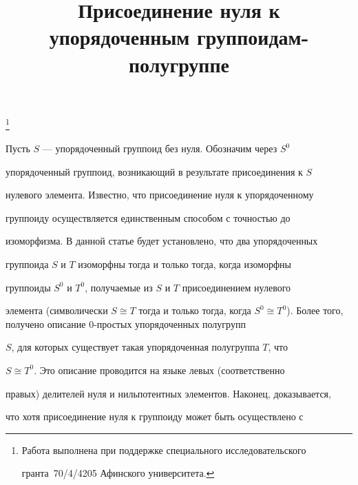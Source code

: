 \title{Присоединение нуля к упорядоченным группоидам-полугруппе} 


\thanks{Работа выполнена при поддержке специального исследовательского 


гранта \No\,70/4/4205 Афинского университета.} 


 


\date{} 




\pagestyle{plain} %


 




\maketitle 


\label{begin} 


 


 


Пусть $S$ --- упорядоченный группоид без нуля. Обозначим через $S^0$ 


упорядоченный группоид, возникающий в результате присоединения к $S$ 


нулевого элемента. Известно, что присоединение нуля к упорядоченному 


группоиду осуществляется единственным способом с точностью до 


изоморфизма. В данной статье будет установлено, что два упорядоченных 


группоида $S$ и $T$ изоморфны тогда и только тогда, когда изоморфны 


группоиды $S^0$ и $T^0$, получаемые из $S$ и $T$ присоединением нулевого 


элемента (символически $S\cong T$ тогда и только тогда, когда $S^0\cong 


T^0$). Более того, получено описание 0-простых упорядоченных полугрупп 


$S$, для которых существует такая упорядоченная полугруппа $T$, что 


$S\cong T^0$. Это описание проводится на языке левых (соответственно 


правых) делителей нуля и нильпотентных элементов. Наконец, доказывается, 


что хотя присоединение нуля к группоиду может быть осуществлено с 


